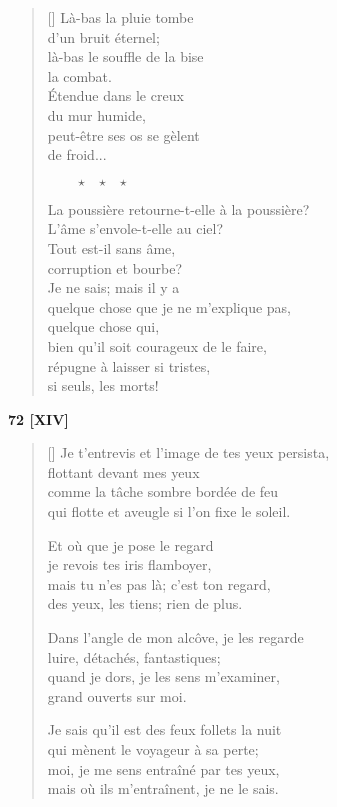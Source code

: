\documentclass[a4paper,12pt]{book}
\begin{document}
\begin{verse}[\versewidth]
  Là-bas la pluie tombe \\
  d'un bruit éternel; \\
  là-bas le souffle de la bise \\
  la combat. \\
  Étendue dans le creux \\
  du mur humide, \\
  peut-être ses os se gèlent \\
  de froid...

  $\ \ \ \ \ \ \ \ \ \star \ \ \ \star \ \ \ \star$

  La poussière retourne-t-elle à la poussière? \\
  L'âme s'envole-t-elle au ciel? \\
  Tout est-il sans âme, \\
  corruption et bourbe? \\
  Je ne sais; mais il y a \\
  quelque chose que je ne m'explique pas, \\
  quelque chose qui, \\
  bien qu'il soit courageux de le faire, \\
  répugne à laisser si tristes, \\
  si seuls, les morts!
\end{verse}

\bigskip

\begin{center}
  \textbf{72 [XIV]}
\end{center}

\settowidth{\versewidth}{Je sais qu'il est des feux follets la nuit}

\begin{verse}[\versewidth]
  Je t'entrevis et l'image de tes yeux persista, \\
  flottant devant mes yeux \\
  comme la tâche sombre bordée de feu \\
  qui flotte et aveugle si l'on fixe le soleil.

  Et où que je pose le regard \\
  je revois tes iris flamboyer, \\
  mais tu n'es pas là; c'est ton regard, \\
  des yeux, les tiens; rien de plus.

  Dans l'angle de mon alcôve, je les regarde \\
  luire, détachés, fantastiques; \\
  quand je dors, je les sens m'examiner, \\
  grand ouverts sur moi.

  Je sais qu'il est des feux follets la nuit \\
  qui mènent le voyageur à sa perte; \\
  moi, je me sens entraîné par tes yeux, \\
  mais où ils m'entraînent, je ne le sais.
\end{verse}
\end{document}
